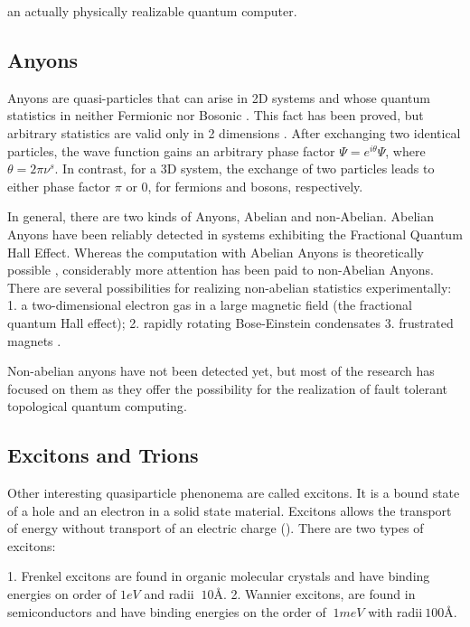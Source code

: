 an actually physically realizable quantum computer\cite{Tqc2,Tqc3}. 


\subsection*{Anyons}
Anyons are quasi-particles that can arise in 2D systems and whose quantum statistics in neither Fermionic nor Bosonic \cite{Anyons1}.  This fact has been proved\cite{Anyons2}, but
arbitrary statistics are valid only in 2 dimensions \cite{Walsh}. After exchanging two identical particles, the wave function gains an arbitrary phase factor $ \Psi = e^{i\theta}\Psi $, where $ \theta = 2\pi\nu^{s} $. In contrast, for a 3D system, the exchange of two particles leads to either phase factor $ \pi $ or $ 0 $, for fermions and bosons, respectively.

In general, there are two kinds of Anyons, Abelian and non-Abelian. Abelian Anyons have been reliably detected in systems exhibiting the Fractional Quantum Hall Effect\cite{FQHE}.  Whereas the computation with Abelian Anyons is theoretically possible \cite{AbelianAnyons}, considerably more attention has been paid to non-Abelian Anyons.
There are several possibilities for realizing non-abelian statistics experimentally: 1. a two-dimensional electron gas in a large magnetic field (the fractional quantum Hall effect); 2. rapidly rotating Bose-Einstein condensates\cite{RrBeC} 3. frustrated magnets \cite{FrMag}.

Non-abelian anyons have not been detected yet, but most of the research has focused on them as they offer the possibility 
for the realization of fault tolerant topological quantum computing\cite{AnyonsTqc}. 

\subsection*{Excitons and Trions}
Other interesting quasiparticle phenonema are called excitons\cite{Excitons2D1}. It is a bound state of a hole and an electron in a solid state material. Excitons allows the transport of energy without transport of an electric charge (). There are two types of excitons: 

1. Frenkel excitons are found in organic molecular crystals\cite{Excitons3} and have binding energies on
order of $ 1eV $ and radii $ ~ 10\text{\AA} $.  
2. Wannier excitons, are found in semiconductors\cite{Excitons2} and have binding energies on the order of $ ~1 meV $ with radii$ ~100\text{\AA}. $

